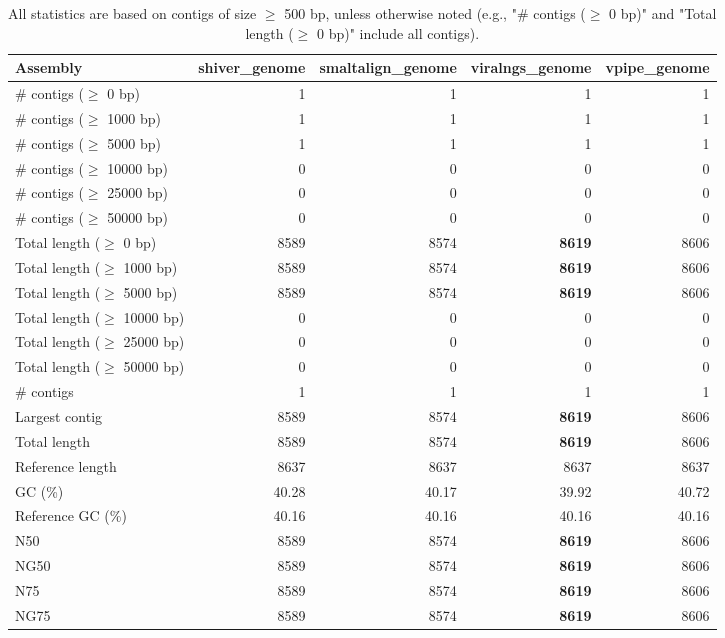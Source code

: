 \documentclass[12pt,a4paper]{article}
\begin{document}
\begin{table}[ht]
\begin{center}
\caption{All statistics are based on contigs of size $\geq$ 500 bp, unless otherwise noted (e.g., "\# contigs ($\geq$ 0 bp)" and "Total length ($\geq$ 0 bp)" include all contigs).}
\begin{tabular}{|l*{4}{|r}|}
\hline
Assembly & shiver\_genome & smaltalign\_genome & viralngs\_genome & vpipe\_genome \\ \hline
\# contigs ($\geq$ 0 bp) & 1 & 1 & 1 & 1 \\ \hline
\# contigs ($\geq$ 1000 bp) & 1 & 1 & 1 & 1 \\ \hline
\# contigs ($\geq$ 5000 bp) & 1 & 1 & 1 & 1 \\ \hline
\# contigs ($\geq$ 10000 bp) & 0 & 0 & 0 & 0 \\ \hline
\# contigs ($\geq$ 25000 bp) & 0 & 0 & 0 & 0 \\ \hline
\# contigs ($\geq$ 50000 bp) & 0 & 0 & 0 & 0 \\ \hline
Total length ($\geq$ 0 bp) & 8589 & 8574 & {\bf 8619} & 8606 \\ \hline
Total length ($\geq$ 1000 bp) & 8589 & 8574 & {\bf 8619} & 8606 \\ \hline
Total length ($\geq$ 5000 bp) & 8589 & 8574 & {\bf 8619} & 8606 \\ \hline
Total length ($\geq$ 10000 bp) & 0 & 0 & 0 & 0 \\ \hline
Total length ($\geq$ 25000 bp) & 0 & 0 & 0 & 0 \\ \hline
Total length ($\geq$ 50000 bp) & 0 & 0 & 0 & 0 \\ \hline
\# contigs & 1 & 1 & 1 & 1 \\ \hline
Largest contig & 8589 & 8574 & {\bf 8619} & 8606 \\ \hline
Total length & 8589 & 8574 & {\bf 8619} & 8606 \\ \hline
Reference length & 8637 & 8637 & 8637 & 8637 \\ \hline
GC (\%) & 40.28 & 40.17 & 39.92 & 40.72 \\ \hline
Reference GC (\%) & 40.16 & 40.16 & 40.16 & 40.16 \\ \hline
N50 & 8589 & 8574 & {\bf 8619} & 8606 \\ \hline
NG50 & 8589 & 8574 & {\bf 8619} & 8606 \\ \hline
N75 & 8589 & 8574 & {\bf 8619} & 8606 \\ \hline
NG75 & 8589 & 8574 & {\bf 8619} & 8606 \\ \hline

\end{tabular}
\end{center}
\end{table}
\end{document}
